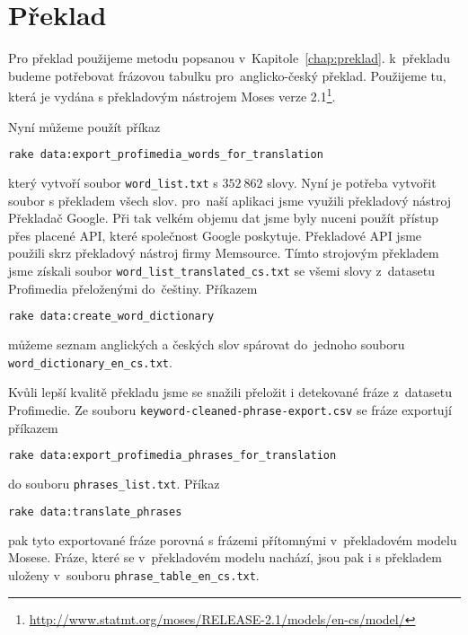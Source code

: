 \section{Překlad}
\label{subsec:zprovozneni_preklad}

Pro překlad použijeme metodu popsanou v~Kapitole~\ref{chap:preklad}. k~překladu budeme potřebovat frázovou tabulku pro~anglicko-český překlad. Použijeme tu, která je vydána s překladovým nástrojem Moses verze 2.1\footnote{\url{http://www.statmt.org/moses/RELEASE-2.1/models/en-cs/model/}}.

Nyní můžeme použít příkaz

\begin{lstlisting}[language=bash]
rake data:export_profimedia_words_for_translation
\end{lstlisting}

který vytvoří soubor \lstinline{word_list.txt} s $352\ 862$ slovy. Nyní je potřeba vytvořit soubor s překladem všech slov. pro~naší aplikaci jsme využili překladový nástroj Překladač Google. Při tak velkém objemu dat jsme byly nuceni použít přístup přes placené API, které společnost Google poskytuje. Překladové API jsme použili skrz překladový nástroj firmy Memsource. Tímto strojovým překladem jsme získali soubor \lstinline{word_list_translated_cs.txt} se všemi slovy z~datasetu Profimedia přeloženými do~češtiny. Příkazem

\begin{lstlisting}[language=bash]
rake data:create_word_dictionary
\end{lstlisting}

můžeme seznam anglických a českých slov spárovat do~jednoho souboru\\\lstinline{word_dictionary_en_cs.txt}.

Kvůli lepší kvalitě překladu jsme se snažili přeložit i detekované fráze z~datasetu Profimedie. Ze souboru \lstinline{keyword-cleaned-phrase-export.csv} se fráze exportují příkazem

\begin{lstlisting}[language=bash]
rake data:export_profimedia_phrases_for_translation
\end{lstlisting}

do souboru \lstinline{phrases_list.txt}. Příkaz

\begin{lstlisting}[language=bash]
rake data:translate_phrases
\end{lstlisting}

pak tyto exportované fráze porovná s frázemi přítomnými v~překladovém modelu Mosese. Fráze, které se v~překladovém modelu nachází, jsou pak i s překladem uloženy v~souboru \lstinline{phrase_table_en_cs.txt}.

